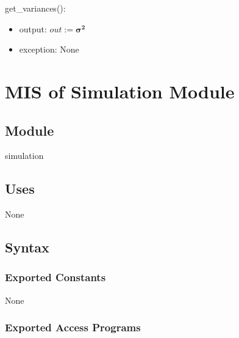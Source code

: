 \documentclass[12pt, titlepage]{article}
\begin{document}
\noindent get\_variances():
\begin{itemize}
    \item output: $out:=\boldsymbol{\sigma^2}$
    \item exception: None
\end{itemize}


\newpage

\section{MIS of Simulation Module} \label{M_Simulate} 




\subsection{Module}

simulation

\subsection{Uses}
None

\subsection{Syntax}

\subsubsection{Exported Constants}
None
\subsubsection{Exported Access Programs}
\end{document}
